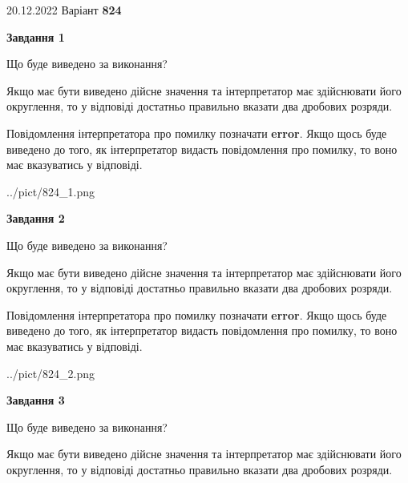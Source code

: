 \documentclass[12pt, ukrainian]{article}
\begin{document}
{20.12.2022 Варіант \No \textbf { 824 }\par}
{
\begin {Large}

{\begin {center}\textbf{Завдання 1}\end {center}}\par
Що буде виведено за виконання? \par

Якщо має бути виведено дійсне значення та інтерпретатор має здійснювати його округлення, 
то у відповіді достатньо правильно вказати два дробових розряди.

Повідомлення інтерпретатора про помилку позначати \textbf{error}.
Якщо щось буде виведено до того, як інтерпретатор видасть повідомлення про помилку, 
то воно має вказуватись у відповіді. \par

\begin{center}
	{../pict/824_1.png}
\end{center}
\newpage

{\begin {center}\textbf{Завдання 2}\end {center}}\par
Що буде виведено за виконання? \par

Якщо має бути виведено дійсне значення та інтерпретатор має здійснювати його округлення, 
то у відповіді достатньо правильно вказати два дробових розряди.

Повідомлення інтерпретатора про помилку позначати \textbf{error}.
Якщо щось буде виведено до того, як інтерпретатор видасть повідомлення про помилку, 
то воно має вказуватись у відповіді. \par

\begin{center}
	{../pict/824_2.png}
\end{center}
\newpage

{\begin {center}\textbf{Завдання 3}\end {center}}\par
Що буде виведено за виконання? \par

Якщо має бути виведено дійсне значення та інтерпретатор має здійснювати його округлення, 
то у відповіді достатньо правильно вказати два дробових розряди.


\end{Large}}
\end{document}
